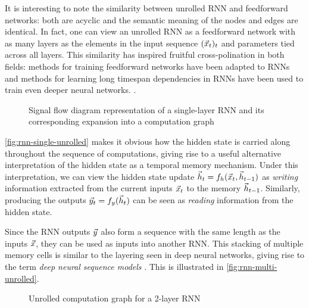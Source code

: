 It is interesting to note the similarity between unrolled RNN and feedforward
networks: both are acyclic and the semantic meaning of the nodes and edges are
identical. In fact, one can view an unrolled RNN as a feedforward network with
as many layers as the elements in the input sequence $(\vec{x}_t)_t$ and
parameters tied across all layers. This similarity has inspired fruitful
cross-polination in both fields: methods for training feedforward networks have
been adapted to RNNs and methods for learning long timespan dependencies in
RNNs have been used to train even deeper neural networks. . 

\begin{figure}[htpb]
    \centering
    
    \caption{Signal flow diagram representation of a single-layer RNN and its corresponding
    expansion into a computation graph}
    \label{fig:rnn-single-unrolled}
\end{figure}

\autoref{fig:rnn-single-unrolled} makes it obvious how the hidden state is
carried along throughout the sequence of computations, giving rise to a useful
alternative interpretation of the hidden state as a temporal memory mechanism.
Under this interpretation, we can view the hidden state update $\vec{h}_t = f_h
(\vec{x}_t, \vec{h}_{t-1})$ as \emph{writing} information extracted from the
current inputs $\vec{x}_t$ to the memory $\vec{h}_{t-1}$. Similarly, producing
the outputs $\vec{y}_t = f_y (\vec{h}_t)$ can be seen as \emph{reading}
information from the hidden state.


Since the RNN outputs $\vec{y}$ also form a sequence with the same length as
the inputs $\vec{x}$, they can be used as inputs into another RNN. This
stacking of multiple memory cells is similar to the layering seen in deep
neural networks, giving rise to the term \emph{deep neural sequence models}
. This is illustrated in \autoref{fig:rnn-multi-unrolled}.

\begin{figure}[htpb]
    \centering
    
    \caption{Unrolled computation graph for a 2-layer RNN}
    \label{fig:rnn-multi-unrolled}
\end{figure}


